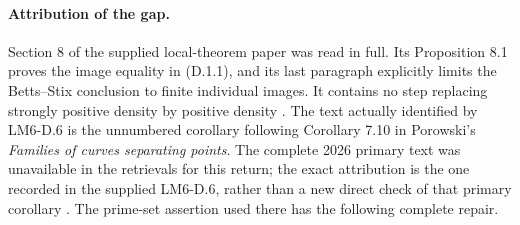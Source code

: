 \paragraph{Attribution of the gap.}
Section 8 of the supplied local-theorem paper was read in full.
Its Proposition 8.1 proves the image equality in (D.1.1), and its
last paragraph explicitly limits the Betts--Stix conclusion to
finite individual images. It contains no step replacing strongly
positive density by positive density
\cite[\S8, Proposition 8.1 and final paragraph]{AgentOpenAILocal}.
The text actually identified by LM6-D.6 is the unnumbered
corollary following Corollary 7.10 in Porowski's
\emph{Families of curves separating points}. The complete 2026
primary text was unavailable in the retrievals for this return;
the exact attribution is the one recorded in the supplied
LM6-D.6, rather than a new direct check of that primary corollary
\cite[D.5--D.6]{AgentLM6}. The prime-set assertion used there has
the following complete repair.

